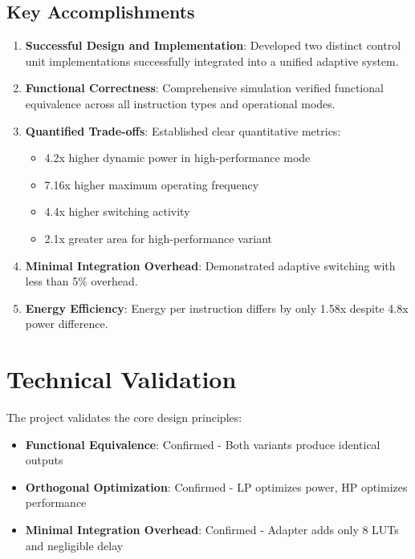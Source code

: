 \documentclass[15pt,a4paper]{report}
\begin{document}
\subsection{Key Accomplishments}

\begin{enumerate}
    \item \textbf{Successful Design and Implementation}: Developed two distinct control unit implementations successfully integrated into a unified adaptive system.
    
    \item \textbf{Functional Correctness}: Comprehensive simulation verified functional equivalence across all instruction types and operational modes.
    
    \item \textbf{Quantified Trade-offs}: Established clear quantitative metrics:
    \begin{itemize}
        \item 4.2x higher dynamic power in high-performance mode
        \item 7.16x higher maximum operating frequency
        \item 4.4x higher switching activity
        \item 2.1x greater area for high-performance variant
    \end{itemize}
    
    \item \textbf{Minimal Integration Overhead}: Demonstrated adaptive switching with less than 5\% overhead.
    
    \item \textbf{Energy Efficiency}: Energy per instruction differs by only 1.58x despite 4.8x power difference.
\end{enumerate}

\section{Technical Validation}

The project validates the core design principles:

\begin{itemize}
    \item \textbf{Functional Equivalence}: Confirmed - Both variants produce identical outputs
    
    \item \textbf{Orthogonal Optimization}: Confirmed - LP optimizes power, HP optimizes performance
    
    \item \textbf{Minimal Integration Overhead}: Confirmed - Adapter adds only 8 LUTs and negligible delay
\end{itemize}
\end{document}
